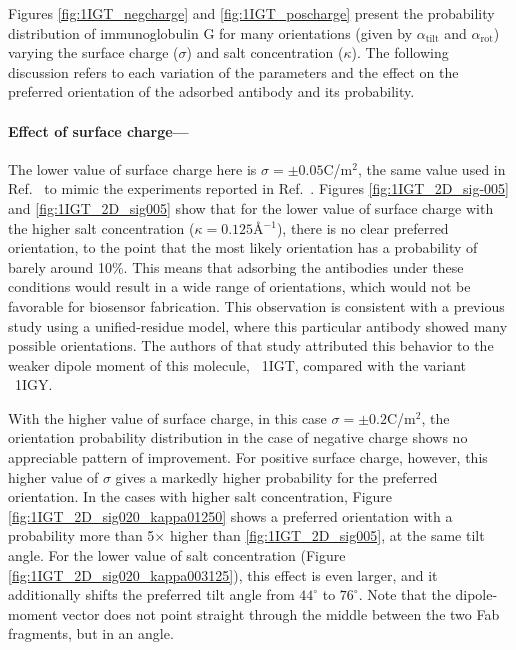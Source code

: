  Figures \ref{fig:1IGT_negcharge} and \ref{fig:1IGT_poscharge} present the probability distribution of immunoglobulin G for many orientations (given by $\alpha_\text{tilt}$ and $\alpha_\text{rot}$) varying the surface charge ($\sigma$) and salt concentration ($\kappa$). 
 The following discussion refers to each variation of the parameters and the effect on the preferred orientation of the adsorbed antibody and its probability.

 \medskip
 
 \paragraph*{Effect of surface charge---}
 
The lower value of surface charge here is $\sigma=\pm 0.05$C/m$^2$, the same value used in Ref.~ to mimic the experiments reported in Ref.~. Figures \ref{fig:1IGT_2D_sig-005} and \ref{fig:1IGT_2D_sig005} show that for the lower value of surface charge with the higher salt concentration ($\kappa=0.125$\AA$^{-1}$), there is no clear preferred orientation, to the point that the most likely orientation has a probability of barely around 10\%. This means that adsorbing the antibodies under these conditions would result in a wide range of orientations, which would not be favorable for biosensor fabrication. This observation is consistent with a previous study using a unified-residue model,\cite{ZhouChenJiang2003} where this particular antibody showed many possible orientations. The authors of that study attributed this behavior to the weaker dipole moment of this molecule, \pdb\ {\small 1IGT}, compared with the variant \pdb\ {\small 1IGY}.
 
 With the higher value of surface charge, in this case $\sigma=\pm0.2$C/m$^2$, the orientation probability distribution in the case of negative charge shows no appreciable pattern of improvement.
 For positive surface charge, however, this higher value of $\sigma$ gives a markedly higher probability for the preferred orientation.
In the cases with higher salt concentration, Figure \ref{fig:1IGT_2D_sig020_kappa01250} shows a preferred orientation with a probability more than 5$\times$ higher than \ref{fig:1IGT_2D_sig005}, at the same tilt angle. For the lower value of salt concentration (Figure \ref{fig:1IGT_2D_sig020_kappa003125}), this effect is even larger, and it additionally shifts the preferred tilt angle from $44^{\circ}$ to $76^{\circ}$. Note that the dipole-moment vector does not point straight through the middle between the two Fab fragments, but in an angle.
 
